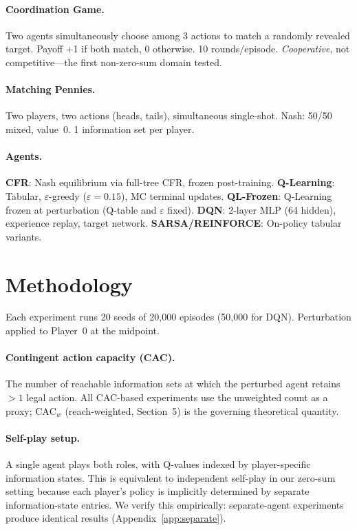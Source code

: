 \documentclass{article}
\begin{document}
\paragraph{Coordination Game.}
Two agents simultaneously choose among 3 actions to match a randomly revealed target. Payoff +1 if both match, 0 otherwise. 10 rounds/episode. \emph{Cooperative}, not competitive---the first non-zero-sum domain tested.

\paragraph{Matching Pennies.}
Two players, two actions (heads, tails), simultaneous single-shot. Nash: 50/50 mixed, value~0. 1 information set per player.

\paragraph{Agents.}
\textbf{CFR}: Nash equilibrium via full-tree CFR, frozen post-training.
\textbf{Q-Learning}: Tabular, $\varepsilon$-greedy ($\varepsilon = 0.15$), MC terminal updates.
\textbf{QL-Frozen}: Q-Learning frozen at perturbation (Q-table and $\varepsilon$ fixed).
\textbf{DQN}: 2-layer MLP (64 hidden), experience replay, target network.
\textbf{SARSA/REINFORCE}: On-policy tabular variants.

\section{Methodology}

Each experiment runs 20 seeds of 20{,}000 episodes (50{,}000 for DQN). Perturbation applied to Player~0 at the midpoint.

\paragraph{Contingent action capacity (CAC).}
The number of reachable information sets at which the perturbed agent retains $>1$ legal action. All CAC-based experiments use the unweighted count as a proxy; $\text{CAC}_w$ (reach-weighted, Section~5) is the governing theoretical quantity.

\paragraph{Self-play setup.}
A single agent plays both roles, with Q-values indexed by player-specific information states. This is equivalent to independent self-play in our zero-sum setting because each player's policy is implicitly determined by separate information-state entries. We verify this empirically: separate-agent experiments produce identical results (Appendix~\ref{app:separate}).
\end{document}
